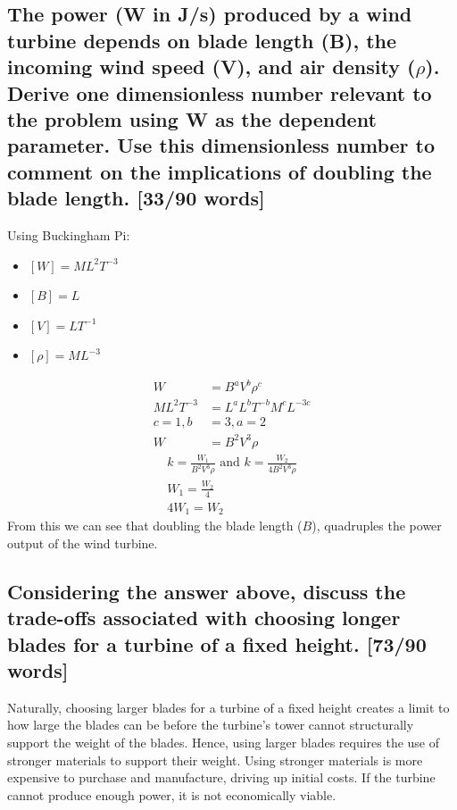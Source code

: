 \documentclass[12pt]{article}
\numberwithin{equation}{section}
\begin{document}
\begin{flushleft}
\subsection[Dimensionless number derivation.]{The power (W in J/s) produced by a wind turbine depends on blade length (B), the incoming wind speed (V), and air density (\(\rho\)). Derive one dimensionless number relevant to the problem using W as the dependent parameter. Use this dimensionless number to comment on the implications of doubling the blade length. [33/90 words]}
Using Buckingham Pi:
\begin{multicols}{2}
  \begin{itemize}
    \item $[W] = ML^2T^{-3}$
    \item $[B] = L$
    \item $[V] = LT^{-1}$
    \item $[\rho] = ML^{-3}$
  \end{itemize}
\end{multicols}
\begin{align}
  W &= B^a V^b \rho^c\\
  ML^2T^{-3} &= L^a L^b T^{-b} M^c L^{-3c}\\
  c = 1, b &= 3, a = 2\\
  W &= B^2 V^3 \rho
\end{align}
\begin{gather}
  k = \frac{W_1}{B^2 V^3 \rho} \textrm{ and } k = \frac{W_2}{4B^2 V^3 \rho}\\
  W_1 = \frac{W_2}{4} \\
  4W_1 = W_2
\end{gather}
From this we can see that doubling the blade length (\(B\)), quadruples the power output of the wind turbine.

\subsection[Trade-offs with longer blade.]{Considering the answer above, discuss the trade-offs associated with choosing longer blades for a turbine of a fixed height. [73/90 words]}
Naturally, choosing larger blades for a turbine of a fixed height creates a limit to how large the blades can be before the turbine’s tower cannot structurally support the weight of the blades. Hence, using larger blades requires the use of stronger materials to support their weight. Using stronger materials is more expensive to purchase and manufacture, driving up initial costs. If the turbine cannot produce enough power, it is not economically viable.


\end{flushleft}
\end{document}
